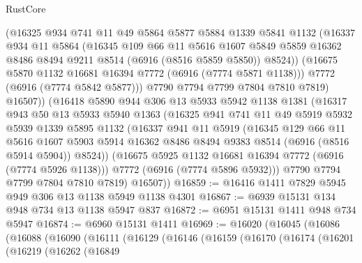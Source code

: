 \begin{lexlean}{RustCore}
\begin{coremodule}
            (@16325
              @934
              @741
              @11
              @49
              @5864
              @5877
              @5884
              @1339
              @5841
              @1132
              (@16337
                @934
                @11
                @5864
                (@16345
                  @109
                  @66
                  @11
                  @5616
                  @1607
                  @5849
                  @5859
                  @16362
                  @8486
                  @8494
                  @9211
                  @8514
                  (@6916 (@8516 @5859 @5850))
                  @8524))
              (@16675 @5870 @1132 @16681 @16394 @7772 (@6916 (@7774 @5871 @1138)))
              @7772
              (@6916 (@7774 @5842 @5877)))
            @7790
            @7794
            @7799
            @7804
            @7810
            @7819)
          @16507))
      (@16418
        @5890
        @944
        @306
        @13
        @5933
        @5942
        @1138
        @1381
        (@16317
          @943
          @50
          @13
          @5933
          @5940
          @1363
          (@16325
            @941
            @741
            @11
            @49
            @5919
            @5932
            @5939
            @1339
            @5895
            @1132
            (@16337
              @941
              @11
              @5919
              (@16345
                @129
                @66
                @11
                @5616
                @1607
                @5903
                @5914
                @16362
                @8486
                @8494
                @9383
                @8514
                (@6916 (@8516 @5914 @5904))
                @8524))
            (@16675 @5925 @1132 @16681 @16394 @7772 (@6916 (@7774 @5926 @1138)))
            @7772
            (@6916 (@7774 @5896 @5932)))
          @7790
          @7794
          @7799
          @7804
          @7810
          @7819)
        @16507))
@16859 := @16416 @1411 @7829 @5945 @949 @306 @13 @1138 @5949 @1138 @4301
@16867 := @6939 @15131 @134 @948 @734 @13 @1138 @5947 @837
@16872 := @6951 @15131 @1411 @948 @734 @5947
@16874 := @6960 @15131 @1411
@16969 := @16020
    (@16045
      (@16086
        (@16088
          (@16090
            (@16111
              (@16129
                (@16146
                  (@16159
                    (@16170
                      (@16174
                        (@16201
                          (@16219
                            (@16262
                              (@16849

\end{coremodule}
\end{lexlean}
